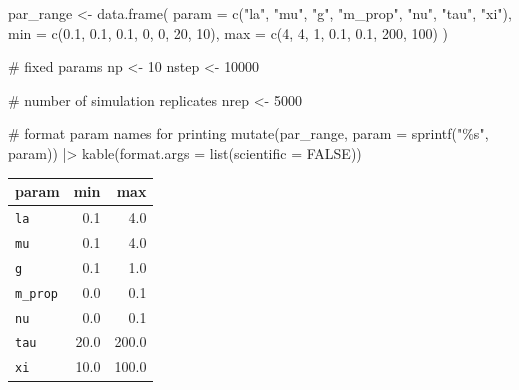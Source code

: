 \documentclass[
  letterpaper,
  DIV=11,
  numbers=noendperiod]{scrartcl}
\newenvironment{Shaded}{\begin{snugshade}}{\end{snugshade}}
\newcommand{\AttributeTok}[1]{\textcolor[rgb]{0.40,0.45,0.13}{#1}}
\newcommand{\CommentTok}[1]{\textcolor[rgb]{0.37,0.37,0.37}{#1}}
\newcommand{\ConstantTok}[1]{\textcolor[rgb]{0.56,0.35,0.01}{#1}}
\newcommand{\DecValTok}[1]{\textcolor[rgb]{0.68,0.00,0.00}{#1}}
\newcommand{\FloatTok}[1]{\textcolor[rgb]{0.68,0.00,0.00}{#1}}
\newcommand{\FunctionTok}[1]{\textcolor[rgb]{0.28,0.35,0.67}{#1}}
\newcommand{\NormalTok}[1]{\textcolor[rgb]{0.00,0.23,0.31}{#1}}
\newcommand{\OtherTok}[1]{\textcolor[rgb]{0.00,0.23,0.31}{#1}}
\newcommand{\SpecialCharTok}[1]{\textcolor[rgb]{0.37,0.37,0.37}{#1}}
\newcommand{\StringTok}[1]{\textcolor[rgb]{0.13,0.47,0.30}{#1}}
\begin{document}
\begin{Shaded}
\begin{Highlighting}[]
\NormalTok{par\_range }\OtherTok{\textless{}{-}} \FunctionTok{data.frame}\NormalTok{(}
    \AttributeTok{param =} \FunctionTok{c}\NormalTok{(}\StringTok{"la"}\NormalTok{, }\StringTok{"mu"}\NormalTok{, }\StringTok{"g"}\NormalTok{, }\StringTok{"m\_prop"}\NormalTok{, }\StringTok{"nu"}\NormalTok{, }\StringTok{"tau"}\NormalTok{, }\StringTok{"xi"}\NormalTok{), }
    \AttributeTok{min   =} \FunctionTok{c}\NormalTok{(}\FloatTok{0.1}\NormalTok{,  }\FloatTok{0.1}\NormalTok{,  }\FloatTok{0.1}\NormalTok{,  }\DecValTok{0}\NormalTok{,        }\DecValTok{0}\NormalTok{,     }\DecValTok{20}\NormalTok{,  }\DecValTok{10}\NormalTok{), }
    \AttributeTok{max   =} \FunctionTok{c}\NormalTok{(}\DecValTok{4}\NormalTok{,    }\DecValTok{4}\NormalTok{,    }\DecValTok{1}\NormalTok{,    }\FloatTok{0.1}\NormalTok{,      }\FloatTok{0.1}\NormalTok{,  }\DecValTok{200}\NormalTok{, }\DecValTok{100}\NormalTok{)}
\NormalTok{)}


\CommentTok{\# fixed params}
\NormalTok{np }\OtherTok{\textless{}{-}} \DecValTok{10}
\NormalTok{nstep }\OtherTok{\textless{}{-}} \DecValTok{10000}

\CommentTok{\# number of simulation replicates}
\NormalTok{nrep }\OtherTok{\textless{}{-}} \DecValTok{5000}

\CommentTok{\# format param names for printing}
\FunctionTok{mutate}\NormalTok{(par\_range, }
       \AttributeTok{param =} \FunctionTok{sprintf}\NormalTok{(}\StringTok{"\textasciigrave{}\%s\textasciigrave{}"}\NormalTok{, param)) }\SpecialCharTok{|\textgreater{}} 
    \FunctionTok{kable}\NormalTok{(}\AttributeTok{format.args =} \FunctionTok{list}\NormalTok{(}\AttributeTok{scientific =} \ConstantTok{FALSE}\NormalTok{))}
\end{Highlighting}
\end{Shaded}

\begin{longtable}[]{@{}lrr@{}}
\toprule\noalign{}
param & min & max \\
\midrule\noalign{}
\endhead
\bottomrule\noalign{}
\endlastfoot
\texttt{la} & 0.1 & 4.0 \\
\texttt{mu} & 0.1 & 4.0 \\
\texttt{g} & 0.1 & 1.0 \\
\texttt{m\_prop} & 0.0 & 0.1 \\
\texttt{nu} & 0.0 & 0.1 \\
\texttt{tau} & 20.0 & 200.0 \\
\texttt{xi} & 10.0 & 100.0 \\
\end{longtable}
\end{document}

